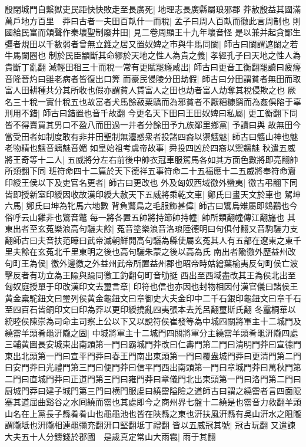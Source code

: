 殷閉城門自繫獄吏民距快快敗走至長廣死|{
	地理志長廣縣屬琅邪郡}
莽赦殷益其國滿萬戶地方百里　莽曰古者一夫田百畒什一而稅|{
	孟子曰周人百畒而徹此言周制也}
則國給民富而頌聲作秦壞聖制廢井田|{
	見二卷周顯王十九年壞音怪}
是以兼并起貪鄙生彊者規田以千數弱者曾無立錐之居又置奴婢之市與牛馬同闌|{
	師古曰闌謂遮闌之若牛馬闌圈也}
制於民臣顓斷其命繆於天地之性人為貴之義|{
	孝經孔子曰天地之性人為貴斷丁亂翻}
減輕田租三十而稅一常有更賦罷癃咸出|{
	師古曰更音工衡翻罷讀曰疲癃音隆晉灼曰雖老病者皆復出口筭}
而豪民侵陵分田劫假|{
	師古曰分田謂貧者無田而取富人田耕種共分其所收也假亦謂貧人賃富人之田也劫者富人劫奪其稅侵欺之也}
厥名三十稅一實什稅五也故富者犬馬餘菽粟驕而為邪貧者不厭糟糠窮而為姦俱陷于辜刑用不錯|{
	師古曰錯置也音千故翻}
今更名天下田曰王田奴婢曰私屬|{
	更工衡翻下同}
皆不得賣買其男口不盈八而田過一井者分餘田予九族鄰里鄉黨|{
	予讀曰與}
故無田今當受田者如制度敢有非井田聖制無灋惑衆者投諸四裔以禦魑魅|{
	師古曰魑山神也魅老物精也魑音螭魅音媚}
如皇始祖考虞帝故事|{
	舜投四凶於四裔以禦魑魅}
秋遣五威將王奇等十二人|{
	五威將分左右前後中帥衣冠車服駕馬各如其方面色數將即亮翻帥所類翻下同}
班符命四十二篇於天下德祥五事符命二十五福應十二五威將奉符命齎印綬王侯以下及吏官名更者|{
	師古曰更改也}
外及匈奴西域徼外蠻夷|{
	徼古弔翻下同}
皆即授新室印綬因收故漢印綬大赦天下五威將乘乾文車|{
	鄭氏曰畫天文於車也}
駕坤六馬|{
	鄭氏曰坤為牝馬六地數}
背負鷩鳥之毛服飾甚偉|{
	師古曰鷩烏雉屬即鵕䴊也今俗呼云山雞非也鷩音鼈}
每一將各置五帥將持節帥持幢|{
	帥所類翻幢傳江翻旛也}
其東出者至玄菟樂浪高句驪夫餘|{
	菟音塗樂浪音洛琅陸德明曰句俱付翻又音駒驪力支翻師古曰夫音扶范曄曰武帝滅朝鮮開高句驪為縣使屬玄菟其人有五部在遼東之東千里夫餘在玄菟北千里東明之後也高句驪朱蒙之後以高為氏}
南出者隃徼外歷益州改句町王為侯|{
	徼外邊徼之外益州武帝所置益州郡也昭帝時姑繒葉榆夷反句町侯亡波擊反者有功立為王隃與踰同徼工釣翻句町音劬挺}
西出至西域盡改其王為侯北出至匈奴庭授單于印改漢印文去璽言章|{
	印符也信也亦因也封物相因付漢官儀曰諸侯王黄金槖駝鈕文曰璽列侯黄金龜鈕文曰章御史大夫金印中二千石銀印龜鈕文曰章千石至四百石皆銅印文曰印為莽以更印綬撓亂四夷張本去羌呂翻璽斯氏翻}
冬靁桐華以統睦侯陳崇為司命主司察上公以下又以說符侯崔發等為中城四關將軍主十二城門及繞霤羊頭肴黽汧隴之固|{
	中城將軍主十二城門四關將軍分主繞霤羊頭肴黽汧隴四處三輔黄圖長安城東出南頭第一門曰霸城門莽改曰仁夀門第二門曰清明門莽曰宣德門東出北頭第一門曰宣平門莽曰春王門南出東頭第一門曰覆盎城門莽曰更清門第二門曰安門莽曰光禮門第三門曰便門莽曰信平門西出南頭第一門曰章城門莽曰萬秋門第二門曰直城門莽曰正道門第三門曰雍門莽曰章儀門北出東頭第一門曰洛門第二門曰厨城門莽曰建子城門第三門曰横門服䖍曰繞霤隘險之道師古曰謂之繞霤者言四面阸塞其道屈曲谿谷之水囘繞而霤也其處即今之商州界七盤十二繞是也霤音力救翻羊頭山名在上黨長子縣肴肴山也黽黽池也皆在陜縣之東也汧扶風汧縣有吳山汧水之阻隴謂隴坻也汧隴相連黽彌充翻汧口堅翻坻丁禮翻}
皆以五威冠其號|{
	冠古玩翻}
又遣諫大夫五十人分鑄錢於郡國　是歲真定常山大雨雹|{
	雨于其翻}



